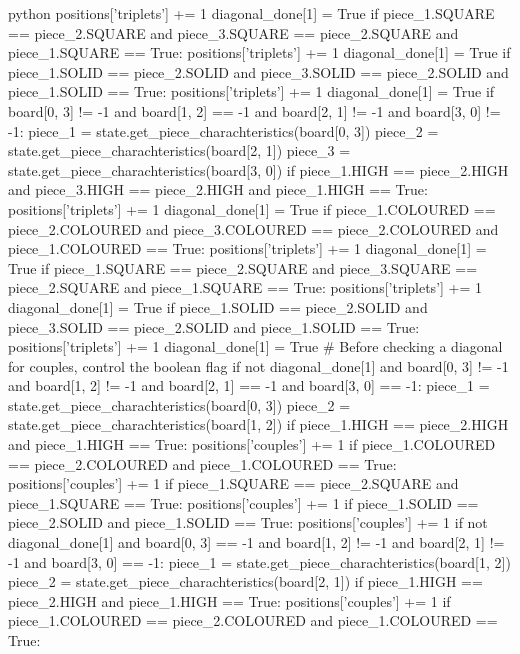 \begin{mintedbox}{python}
            positions['triplets'] += 1
            diagonal_done[1] = True
        if piece_1.SQUARE == piece_2.SQUARE and piece_3.SQUARE == piece_2.SQUARE and piece_1.SQUARE == True:
            positions['triplets'] += 1
            diagonal_done[1] = True
        if piece_1.SOLID == piece_2.SOLID and piece_3.SOLID == piece_2.SOLID and piece_1.SOLID == True:
            positions['triplets'] += 1
            diagonal_done[1] = True
    if board[0, 3] != -1 and board[1, 2] == -1 and board[2, 1] != -1 and board[3, 0] != -1:
        piece_1 = state.get_piece_charachteristics(board[0, 3])
        piece_2 = state.get_piece_charachteristics(board[2, 1])
        piece_3 = state.get_piece_charachteristics(board[3, 0])
        if piece_1.HIGH == piece_2.HIGH and piece_3.HIGH == piece_2.HIGH and piece_1.HIGH == True:
            positions['triplets'] += 1
            diagonal_done[1] = True
        if piece_1.COLOURED == piece_2.COLOURED and piece_3.COLOURED == piece_2.COLOURED and piece_1.COLOURED == True:
            positions['triplets'] += 1
            diagonal_done[1] = True
        if piece_1.SQUARE == piece_2.SQUARE and piece_3.SQUARE == piece_2.SQUARE and piece_1.SQUARE == True:
            positions['triplets'] += 1
            diagonal_done[1] = True
        if piece_1.SOLID == piece_2.SOLID and piece_3.SOLID == piece_2.SOLID and piece_1.SOLID == True:
            positions['triplets'] += 1
            diagonal_done[1] = True
    # Before checking a diagonal for couples, control the boolean flag
    if not diagonal_done[1] and board[0, 3] != -1 and board[1, 2] != -1 and board[2, 1] == -1 and board[3, 0] == -1:
        piece_1 = state.get_piece_charachteristics(board[0, 3])
        piece_2 = state.get_piece_charachteristics(board[1, 2])
        if piece_1.HIGH == piece_2.HIGH and piece_1.HIGH == True:
            positions['couples'] += 1
        if piece_1.COLOURED == piece_2.COLOURED and piece_1.COLOURED == True:
            positions['couples'] += 1
        if piece_1.SQUARE == piece_2.SQUARE and piece_1.SQUARE == True:
            positions['couples'] += 1
        if piece_1.SOLID == piece_2.SOLID and piece_1.SOLID == True:
            positions['couples'] += 1
    if not diagonal_done[1] and board[0, 3] == -1 and board[1, 2] != -1 and board[2, 1] != -1 and board[3, 0] == -1:
        piece_1 = state.get_piece_charachteristics(board[1, 2])
        piece_2 = state.get_piece_charachteristics(board[2, 1])
        if piece_1.HIGH == piece_2.HIGH and piece_1.HIGH == True:
            positions['couples'] += 1
        if piece_1.COLOURED == piece_2.COLOURED and piece_1.COLOURED == True:

\end{mintedbox}
